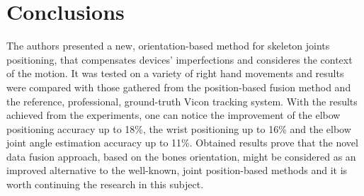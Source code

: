 \documentclass[sensors,article,submit,moreauthors,pdftex,10pt,a4paper]{mdpi}
\begin{document}
\section{Conclusions}


The authors presented a new, orientation-based method for skeleton joints positioning, that compensates devices' imperfections and consideres the context of the motion. It was tested on a variety of right hand movements and results were compared with those gathered from the position-based fusion method and the reference, professional, ground-truth Vicon tracking system. With the results achieved from the experiments, one can notice the improvement of the elbow positioning accuracy up to 18\%, the wrist positioning up to 16\% and the elbow joint angle estimation accuracy up to 11\%.
Obtained results prove that the novel data fusion approach, based on the bones orientation, might be considered as an improved alternative to the well-known, joint position-based methods and it is worth continuing the research in this subject.


\vspace{6pt} 





\end{document}
